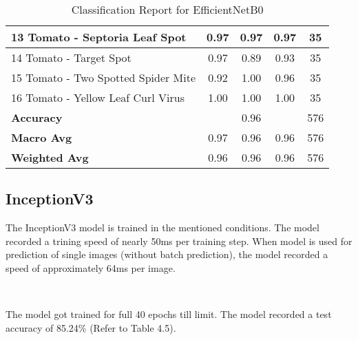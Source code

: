 \begin{table}[h!]
{\begin{tabular}{|l|c|c|c|c|}
    13 Tomato - Septoria Leaf Spot                    & 0.97               & 0.97            & 0.97              & 35               \\ \hline
    14 Tomato - Target Spot                           & 0.97               & 0.89            & 0.93              & 35               \\ \hline
    15 Tomato - Two Spotted Spider Mite               & 0.92               & 1.00            & 0.96              & 35               \\ \hline
    16 Tomato - Yellow Leaf Curl Virus                & 1.00               & 1.00            & 1.00              & 35               \\ \hline
    \textbf{Accuracy}                                 & \multicolumn{3}{c|}{0.96}            & 576              \\ \hline
    \textbf{Macro Avg}                                & 0.97               & 0.96            & 0.96              & 576              \\ \hline
    \textbf{Weighted Avg}                             & 0.96               & 0.96            & 0.96              & 576              \\ \hline
    \end{tabular}%
    }
    \caption{Classification Report for EfficientNetB0}
    \label{tab:classification_report_en}
\end{table}


\subsection{InceptionV3}

The InceptionV3 model is trained in the mentioned conditions. The model recorded a trining speed of nearly 50ms per training step. When model is used for prediction of single images (without batch prediction), the model recorded a speed of approximately 64ms per image. 

\

The model got trained for full 40 epochs till limit. The model recorded a test accuracy of 85.24\% (Refer to Table 4.5).

